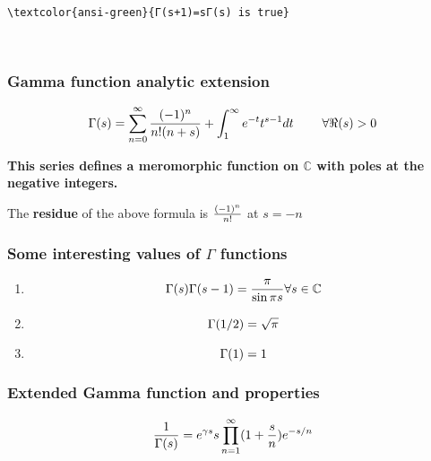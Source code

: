 \documentclass[11pt]{article}
\providecommand{\tightlist}{%
      \setlength{\itemsep}{0pt}\setlength{\parskip}{0pt}}
\newcommand{\prompt}[4]{
        {\ttfamily\llap{{\color{#2}[#3]:\hspace{3pt}#4}}\vspace{-\baselineskip}}
    }
\begin{document}
    \begin{Verbatim}[commandchars=\\\{\}]
\textcolor{ansi-green}{Γ(s+1)=sΓ(s) is true}
    \end{Verbatim}
 
            
\prompt{Out}{outcolor}{2}{}
    
    \begin{center}
    \end{center}
    { \hspace*{\fill} \\}
    

    \subsubsection{Gamma function analytic
extension}\label{gamma-function-analytic-extension}

\[\Huge\Gamma(s)=\sum_{n=0}^{\infty}\dfrac{(-1)^{n}}{n!(n+s)} + \int_{1}^{\infty} e^{-t}t^{s-1}dt\quad \forall \Re(s)>0\]

\textbf{This series defines a meromorphic function on \(\mathbb{C}\)
with poles at the negative integers.}

The \textbf{residue} of the above formula is
\(\Large\frac{(-1)^{n}}{n!}\) at \(s=-n\)

\subsubsection{\texorpdfstring{Some interesting values of \(\Gamma\)
functions}{Some interesting values of \textbackslash Gamma functions}}\label{some-interesting-values-of-gamma-functions}

\begin{enumerate}
\def\labelenumi{\arabic{enumi})}
\tightlist
\item
  \[\Large\Gamma(s)\Gamma(s-1)=\frac{\pi}{\sin \pi s} \forall s\in\mathbb{C}\]
\item
  \[\Large\Gamma(1/2)=\sqrt\pi\]
\item
  \[\Large\Gamma(1)=1\]
\end{enumerate}

\subsubsection{Extended Gamma function and
properties}\label{extended-gamma-function-and-properties}

\[\Huge\frac{1}{\Gamma(s)}=e^{\gamma s}s\prod_{n=1}^{\infty}(1+\frac{s}{n})e^{-s/n}\]
\end{document}
